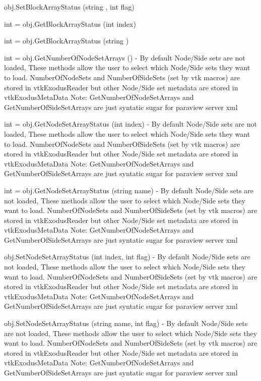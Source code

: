 \begin{DoxyItemize}
\item {\ttfamily obj.\-Set\-Block\-Array\-Status (string , int flag)}  
\item {\ttfamily int = obj.\-Get\-Block\-Array\-Status (int index)}  
\item {\ttfamily int = obj.\-Get\-Block\-Array\-Status (string )}  
\item {\ttfamily int = obj.\-Get\-Number\-Of\-Node\-Set\-Arrays ()} -\/ By default Node/\-Side sets are not loaded, These methods allow the user to select which Node/\-Side sets they want to load. Number\-Of\-Node\-Sets and Number\-Of\-Side\-Sets (set by vtk macros) are stored in vtk\-Exodus\-Reader but other Node/\-Side set metadata are stored in vtk\-Exodus\-Meta\-Data Note\-: Get\-Number\-Of\-Node\-Set\-Arrays and Get\-Number\-Of\-Side\-Set\-Arrays are just syntatic sugar for paraview server xml  
\item {\ttfamily int = obj.\-Get\-Node\-Set\-Array\-Status (int index)} -\/ By default Node/\-Side sets are not loaded, These methods allow the user to select which Node/\-Side sets they want to load. Number\-Of\-Node\-Sets and Number\-Of\-Side\-Sets (set by vtk macros) are stored in vtk\-Exodus\-Reader but other Node/\-Side set metadata are stored in vtk\-Exodus\-Meta\-Data Note\-: Get\-Number\-Of\-Node\-Set\-Arrays and Get\-Number\-Of\-Side\-Set\-Arrays are just syntatic sugar for paraview server xml  
\item {\ttfamily int = obj.\-Get\-Node\-Set\-Array\-Status (string name)} -\/ By default Node/\-Side sets are not loaded, These methods allow the user to select which Node/\-Side sets they want to load. Number\-Of\-Node\-Sets and Number\-Of\-Side\-Sets (set by vtk macros) are stored in vtk\-Exodus\-Reader but other Node/\-Side set metadata are stored in vtk\-Exodus\-Meta\-Data Note\-: Get\-Number\-Of\-Node\-Set\-Arrays and Get\-Number\-Of\-Side\-Set\-Arrays are just syntatic sugar for paraview server xml  
\item {\ttfamily obj.\-Set\-Node\-Set\-Array\-Status (int index, int flag)} -\/ By default Node/\-Side sets are not loaded, These methods allow the user to select which Node/\-Side sets they want to load. Number\-Of\-Node\-Sets and Number\-Of\-Side\-Sets (set by vtk macros) are stored in vtk\-Exodus\-Reader but other Node/\-Side set metadata are stored in vtk\-Exodus\-Meta\-Data Note\-: Get\-Number\-Of\-Node\-Set\-Arrays and Get\-Number\-Of\-Side\-Set\-Arrays are just syntatic sugar for paraview server xml  
\item {\ttfamily obj.\-Set\-Node\-Set\-Array\-Status (string name, int flag)} -\/ By default Node/\-Side sets are not loaded, These methods allow the user to select which Node/\-Side sets they want to load. Number\-Of\-Node\-Sets and Number\-Of\-Side\-Sets (set by vtk macros) are stored in vtk\-Exodus\-Reader but other Node/\-Side set metadata are stored in vtk\-Exodus\-Meta\-Data Note\-: Get\-Number\-Of\-Node\-Set\-Arrays and Get\-Number\-Of\-Side\-Set\-Arrays are just syntatic sugar for paraview server xml  

\end{DoxyItemize}
